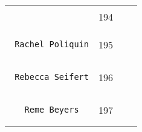 \documentclass[]{article}
\begin{document}
\begin{longtable}[c]{@{}llll@{}}
\begin{minipage}[t]{0.39\columnwidth}
\begin{verbatim}
\end{verbatim}
\end{minipage} & \begin{minipage}[t]{0.10\columnwidth}\raggedright
194
\end{minipage} & \begin{minipage}[t]{0.13\columnwidth}\raggedright
\end{minipage} & \begin{minipage}[t]{0.15\columnwidth}\raggedright
\end{minipage}
\\\noalign{\medskip}
\begin{minipage}[t]{0.39\columnwidth}\raggedright
\begin{verbatim}
 Rachel Poliquin
\end{verbatim}
\end{minipage} & \begin{minipage}[t]{0.10\columnwidth}\raggedright
195
\end{minipage} & \begin{minipage}[t]{0.13\columnwidth}\raggedright
\end{minipage} & \begin{minipage}[t]{0.15\columnwidth}\raggedright
\end{minipage}
\\\noalign{\medskip}
\begin{minipage}[t]{0.39\columnwidth}\raggedright
\begin{verbatim}
 Rebecca Seifert
\end{verbatim}
\end{minipage} & \begin{minipage}[t]{0.10\columnwidth}\raggedright
196
\end{minipage} & \begin{minipage}[t]{0.13\columnwidth}\raggedright
\end{minipage} & \begin{minipage}[t]{0.15\columnwidth}\raggedright
\end{minipage}
\\\noalign{\medskip}
\begin{minipage}[t]{0.39\columnwidth}\raggedright
\begin{verbatim}
   Reme Beyers
\end{verbatim}
\end{minipage} & \begin{minipage}[t]{0.10\columnwidth}\raggedright
197
\end{minipage} & \begin{minipage}[t]{0.13\columnwidth}\raggedright

\end{minipage}
\end{longtable}
\end{document}
